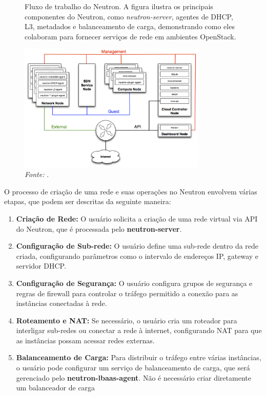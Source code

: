 \begin{figure}[htbp]
  \centering
  \caption{Fluxo de trabalho do Neutron. A figura ilustra os principais componentes do Neutron, como \textit{neutron-server}, agentes de DHCP, L3, metadados e balanceamento de carga, demonstrando como eles colaboram para fornecer serviços de rede em ambientes OpenStack.}
  \includegraphics[width=0.8\textwidth]{images/architecture_neutron.png}
  \caption*{\textit{Fonte:} \citep{DocumentacaoOpenstack}.}
  \label{fig:neutron_architecture}
\end{figure}


O processo de criação de uma rede e suas operações no Neutron envolvem várias etapas, que podem ser descritas da seguinte maneira:

\begin{enumerate}
    \item \textbf{Criação de Rede:} O usuário solicita a criação de uma rede virtual via API do Neutron, que é processada pelo \textbf{neutron-server}.
    \item \textbf{Configuração de Sub-rede:} O usuário define uma sub-rede dentro da rede criada, configurando parâmetros como o intervalo de endereços IP, gateway e servidor DHCP.
    \item \textbf{Configuração de Segurança:} O usuário configura grupos de segurança e regras de firewall para controlar o tráfego permitido a conexão para as instâncias conectadas à rede.
    \item \textbf{Roteamento e NAT:} Se necessário, o usuário cria um roteador para interligar sub-redes ou conectar a rede à internet, configurando NAT para que as instâncias possam acessar redes externas.
    \item \textbf{Balanceamento de Carga:} Para distribuir o tráfego entre várias instâncias, o usuário pode configurar um serviço de balanceamento de carga, que será gerenciado pelo \textbf{neutron-lbaas-agent}. Não é necessário criar diretamente um balanceador de carga
\end{enumerate}

